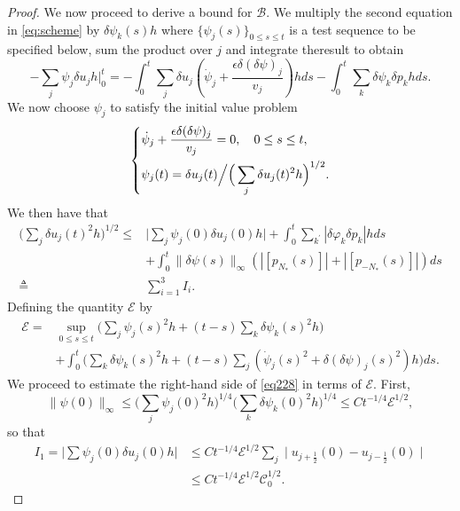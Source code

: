 \documentclass[a4paper,oneside,11pt]{article}
\numberwithin{equation}{section}
\begin{document}
\begin{proof}
We now proceed to derive a bound for $\mathscr{B}$. 
We multiply the second equation in \eqref{eq:scheme} by \(\delta\psi_{k}(s)h\)  where \(\{\psi_{j}(s)\}_{0\leq s\leq t}\) is a test sequence to be specified below, sum the product over \(j\) and integrate theresult to obtain
\[-\sum_{j}\psi_{j}\delta u_{j}h\Big|_{0}^t=-\int_{0}^{t}\sum_{j}\delta u_{j}\left(\dot{\psi}_{j}+\frac{\epsilon\delta(\delta\psi)_{j}}{v_{j}}\right)hds-\int_{0}^{t}\sum_{k}\delta\psi_{k}\delta p_{k}hds.\]
We now choose \(\psi_{j}\) to satisfy the initial value problem
\begin{equation}\label{back-para}
  \left\{\begin{aligned}
  \displaystyle  &\dot{\psi}_{j}+\frac{\epsilon\delta(\delta\psi)_{j}}{v_{j}}=0,\quad0\leq s\leq t,\\&\psi_{j}(t)=\delta u_{j}(t)\Big/\Big(\sum_{j}\delta u_{j}(t)^{2}h\Big)^{1/2}.
  \end{aligned}  \right.
\end{equation}
We then have that
\begin{equation}\label{eq228}
 \begin{aligned}
\Big(\sum_{j}\delta u_{j}(t)^{2}h\Big)^{1/2}\leq & \Big|\sum_{j}\psi_{j}(0)\delta u_{j}(0)h\Big|+\int_{0}^{t}\sum_{k^{\prime}}|\delta\varphi_{k}\delta p_{k}|hds \\&+\int_{0}^{t}\|\delta\psi(s)\|_{\infty}(|[p_{N_* }(s)]|+|[p_{- N_* }(s)]|)ds\\\triangleq &\sum_{i=1}^3I_i.
\end{aligned} 
\end{equation}
Defining the quantity $\mathscr{E}$ by
\[\begin{aligned}\label{eq229}
\mathscr{E}=& \sup_{0\leq s\leq t}\Big(\sum_{j}\psi_{j}(s)^{2}h+(t-s)\sum_{k}\delta\psi_{k}(s)^{2}h\Big)  \\
&+\int_{0}^{t}\Big(\sum\limits_{k}\delta\psi_{k}(s)^{2}h+(t-s)\sum_{j}(\dot{\psi}_{j}(s)^{2}+\delta(\delta\psi)_{j}(s)^{2})h\Big)ds.
\end{aligned}\]
We proceed to estimate the right-hand side of \eqref{eq228} in terms of $\mathscr{E}$. First,
\[\|\psi(0)\|_{\infty}\leq \Big(\sum_{j}\psi_{j}(0)^{2}h\Big)^{1/4}\Big(\sum_{k}\delta\psi_{k}(0)^{2}h\Big)^{1/4}\leq Ct^{-1/4}\mathscr{E}^{1/2},\]
so that
\[\begin{aligned}
I_1=\Big|\sum\psi_{j}(0)\delta u_{j}(0)h \Big|&\leq Ct^{-1/4}\mathscr{E}^{1/2}\sum_{j}\mid u_{j+\frac{1}{2}}(0)-u_{j-\frac{1}{2}}(0)\mid \\
&\leq Ct^{-1/4}\mathscr{E}^{1/2}\mathscr{C}_{0}^{1/2}. 

\end{aligned}\]
\end{proof}
\end{document}
